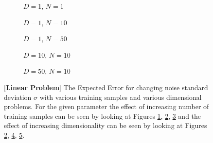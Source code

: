 \begin{figure}[!ht]
  \centering
    \begin{subfigure}{0.3\textwidth}
      \centering
      \caption{$D=1$, $N=1$}
      \label{fig:linear-std_y-N-1-D-1}
    \end{subfigure}
    \begin{subfigure}{0.3\textwidth}
      \centering
      \caption{$D=1$, $N=10$}
      \label{fig:linear-std_y-N-10-D-1}
    \end{subfigure}
    \begin{subfigure}{0.3\textwidth}
      \centering
      \caption{$D=1$, $N=50$}
      \label{fig:linear-std_y-N-50-D-1}
    \end{subfigure}

    \begin{subfigure}{0.3\textwidth}
      \centering
      \caption{$D=10$, $N=10$}
      \label{fig:linear-std_y-N-10-D-10}
    \end{subfigure}
    \begin{subfigure}{0.3\textwidth}
      \centering
      \caption{$D=50$, $N=10$}
      \label{fig:linear-std_y-N-10-D-50}
    \end{subfigure}  

  \caption{[\textbf{Linear Problem}] The Expected Error for changing noise standard deviation $\sigma$ with various training samples and various dimensional problems. For the given parameter the effect of increasing number of training samples can be seen by looking at Figures \ref{fig:linear-std_y-N-1-D-1}, \ref{fig:linear-std_y-N-10-D-1}, \ref{fig:linear-std_y-N-50-D-1} and the effect of increasing dimensionality can be seen by looking at Figures \ref{fig:linear-std_y-N-10-D-1}, \ref{fig:linear-std_y-N-10-D-10}, \ref{fig:linear-std_y-N-10-D-50}.}\label{fig:linear-std_y}
\end{figure}


